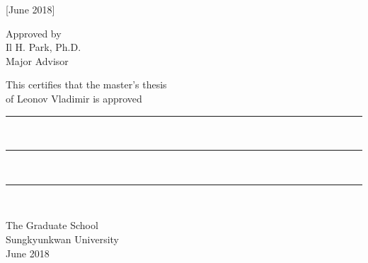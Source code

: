\begin{titlepage}
\begin{center}
{[June 2018]
}



\vspace{4cm}


{\fontsize{16}{18}\selectfont
Approved by \\
\vspace{3mm}
Il H. Park, Ph.D. \\
\vspace{3mm}
Major Advisor \\
}

\end{center}


\afterpage{\blankpage}

\begin{center}

\vspace*{2.5cm}
{\fontsize{16}{18}\selectfont
This certifies that the master's thesis \\
of Leonov Vladimir is approved
}
\end{center}



\thispagestyle{empty}
\vspace{6cm}

\begin{flushright}
\noindent\rule{7cm}{0.4pt} \\
\vspace{0.6cm}
\noindent\rule{7cm}{0.4pt} \\
\vspace{0.6cm}
\noindent\rule{7cm}{0.4pt} \\
\end{flushright}

\vspace{\fill}


\begin{center}
{\fontsize{16}{16}\selectfont
The Graduate School \\
Sungkyunkwan University \\
June 2018\\
}
\end{center}

\afterpage{\blankpage}

\end{titlepage}